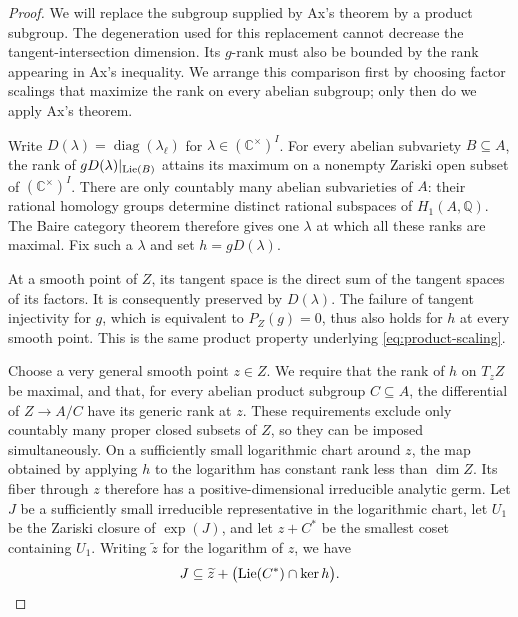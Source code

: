 \begin{proof}
We will replace the subgroup supplied by Ax's theorem by a product
subgroup. The degeneration used for this replacement cannot decrease
the tangent-intersection dimension. Its $g$-rank must also be bounded
by the rank appearing in Ax's inequality. We arrange this comparison
first by choosing factor scalings that maximize the rank on every
abelian subgroup; only then do we apply Ax's theorem.

Write $D(\lambda)=\operatorname{diag}(\lambda_\ell)$ for
$\lambda\in(\mathbb C^\times)^I$. For every abelian subvariety
$B\subseteq A$, the rank of $gD(\lambda)|_{\operatorname{Lie}(B)}$ attains its maximum
on a nonempty Zariski open subset of $(\mathbb C^\times)^I$.
There are only countably many abelian subvarieties of $A$: their rational
homology groups determine distinct rational subspaces of $H_1(A,\mathbb Q)$.
The Baire category theorem therefore gives one $\lambda$ at which all
these ranks are maximal. Fix such a $\lambda$ and set $h=gD(\lambda)$.

At a smooth point of $Z$, its tangent space is the direct sum of the
tangent spaces of its factors. It is consequently preserved by
$D(\lambda)$. The failure of tangent injectivity for $g$, which is
equivalent to $P_Z(g)=0$, thus also holds for $h$ at every smooth point.
This is the same product property underlying
\eqref{eq:product-scaling}.

Choose a very general smooth point $z\in Z$. We require that the rank of
$h$ on $T_zZ$ be maximal, and that, for every abelian product subgroup
$C\subseteq A$, the differential of $Z\longrightarrow A/C$ have its
generic rank at $z$. These requirements exclude only countably many
proper closed subsets of $Z$, so they can be imposed simultaneously.
On a sufficiently small logarithmic chart around $z$, the map obtained
by applying $h$ to the logarithm has constant rank less than $\dim Z$.
Its fiber through $z$ therefore has a positive-dimensional irreducible
analytic germ. Let $J$ be a sufficiently small irreducible representative
in the logarithmic chart, let $U_1$ be the Zariski closure of $\exp(J)$,
and let $z+C^*$ be the smallest coset containing $U_1$.
Writing $\widetilde z$ for the logarithm of $z$, we have
\[
 J\subseteq\widetilde z+
 \bigl(\operatorname{Lie}(C^*)\cap\ker h\bigr).
\]


\end{proof}
